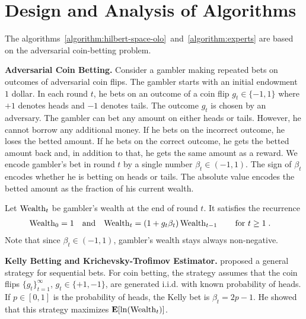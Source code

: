 \section{Design and Analysis of Algorithms}

The algorithms~\ref{algorithm:hilbert-space-olo}~and~\ref{algorithm:experts}
are based on the adversarial coin-betting problem.

\textbf{Adversarial Coin Betting.}
Consider a gambler making repeated bets on outcomes of adversarial coin flips.
The gambler starts with an initial endowment $1$ dollar. In each round $t$, he
bets on an outcome of a coin flip $g_t \in \{-1,1\}$ where $+1$ denotes heads
and $-1$ denotes tails. The outcome $g_t$ is chosen by an adversary.  The
gambler can bet any amount on either heads or tails. However, he cannot borrow
any additional money. If he bets on the incorrect outcome, he loses the betted
amount. If he bets on the correct outcome, he gets the betted amount back and,
in addition to that, he gets the same amount as a reward.  We encode gambler's
bet in round $t$ by a single number $\beta_t \in (-1,1)$.  The sign of
$\beta_t$ encodes whether he is betting on heads or tails. The absolute value
encodes the betted amount as the fraction of his current wealth.

Let $\operatorname{Wealth}_t$ be gambler's wealth at the end of round $t$. It satisfies the
recurrence
\begin{align}
\label{equation:wealth-recurrence}
\operatorname{Wealth}_0 & = 1 &
& \text{and} &
\operatorname{Wealth}_t & = (1 + g_t \beta_t) \operatorname{Wealth}_{t-1} \qquad \text{for $t \ge 1$} \; .
\end{align}
Note that since $\beta_t \in (-1,1)$, gambler's wealth stays always non-negative.

\textbf{Kelly Betting and Krichevsky-Trofimov Estimator.}
\citet{Kelly-1956} proposed a general strategy for sequential bets. For coin
betting, the strategy assumes that the coin flips $\{g_t\}_{t=1}^\infty$, $g_t
\in \{+1,-1\}$, are generated i.i.d. with known probability of heads. If $p \in
[0,1]$ is the probability of heads, the Kelly bet is
$
\beta_t = 2p - 1
$.
He showed that this strategy maximizes $\operatorname*{\mathbf{E}}[\ln(\operatorname{Wealth}_t)]$.

